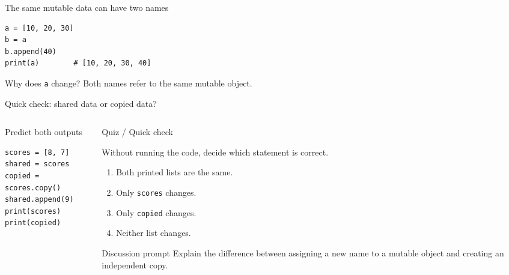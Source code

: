 \documentclass[aspectratio=169]{beamer}
\newcommand{\quizblock}[1]{%
  \begin{alertblock}{Quiz / Quick check}
    #1
  \end{alertblock}
}
\begin{document}
\begin{frame}[fragile]{The same mutable data can have two names}
  \begin{center}
  \end{center}

  \vspace{0.4em}
\begin{lstlisting}
a = [10, 20, 30]
b = a
b.append(40)
print(a)        # [10, 20, 30, 40]
\end{lstlisting}

  \begin{alertblock}{Why does \texttt{a} change?}
    Both names refer to the same mutable object.
  \end{alertblock}
\end{frame}

\begin{frame}[fragile]{Quick check: shared data or copied data?}
  \small
  \begin{columns}[T]
    \begin{column}{0.48\textwidth}
      \begin{block}{Predict both outputs}
\begin{lstlisting}
scores = [8, 7]
shared = scores
copied = scores.copy()
shared.append(9)
print(scores)
print(copied)
\end{lstlisting}
      \end{block}
    \end{column}
    \begin{column}{0.48\textwidth}
      \quizblock{
      Without running the code, decide which statement is correct.
      \begin{enumerate}
        \item Both printed lists are the same.
        \item Only \texttt{scores} changes.
        \item Only \texttt{copied} changes.
        \item Neither list changes.
      \end{enumerate}}
      \begin{exampleblock}{Discussion prompt}
        Explain the difference between assigning a new name to a mutable object
        and creating an independent copy.
      \end{exampleblock}
    \end{column}
  \end{columns}
\end{frame}
\end{document}

